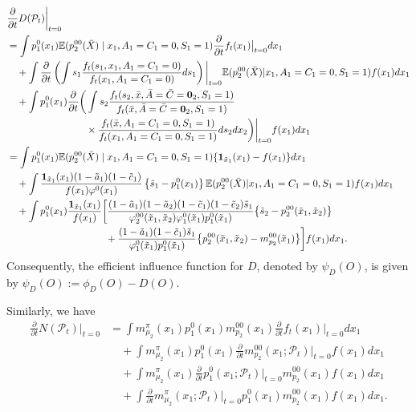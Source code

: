 \documentclass{article}
\newcommand{\pk}{{\varphi}}
\begin{document}
\begin{align}
	&\frac{\partial}{\partial t}D(\mathcal P_t) \bigg\vert_{t=0} \\
	&= \int p_1^0(x_1) \mathbb E(p_2^{00}(\bar X) \mid x_1, A_1=C_1=0, S_1=1) \frac{\partial}{\partial t} f_t(x_1) \big\vert_{t=0} dx_1 \\
	  &\quad+ \int \frac{\partial}{\partial t} \left( \int s_1 \frac{f_t(s_1, x_1, A_1=C_1=0)}{f_t(x_1, A_1=C_1=0)} ds_1 \right)\biggl\vert_{t=0} \mathbb E(p_2^{00}(\bar X) | x_1, A_1=C_1=0, S_1=1) f(x_1)dx_1 \\
	  &\quad+ \int p_1^0(x_1) \frac{\partial}{\partial t} \bigg( \int s_2 \frac{f_t(s_2, \bar x, \bar A=\bar C={\bf 0}_2, S_1=1)}{f_t(\bar x,\bar A=\bar C={\bf 0}_2,S_1=1)} \\
	   &\qquad\qquad\qquad\qquad\times\frac{f_t(\bar x,A_1=C_1=0,S_1=1)}{f_t(x_1,A_1=C_1=0,S_1=1)} ds_2dx_2 \bigg)  \bigg\vert_{t=0} f(x_1)dx_1 \\
	&= \int p_1^0(x_1) \mathbb E(p_2^{00}(\bar X) \mid x_1, A_1=C_1=0, S_1=1) \{ \mathbf1_{\tilde x_1}(x_1) - f(x_1) \} dx_1 \\
	  &\quad+ \int \frac{\mathbf1_{\tilde x_1}(x_1) (1-\tilde a_1)(1-\tilde c_1)}{f(x_1) \pk^0(x_1)} \left\{ \tilde s_1 - p_1^0(x_1) \right\} \mathbb E(p_2^{00}(\bar X) | x_1, A_1=C_1=0, S_1=1) f(x_1)dx_1 \\
	  &\quad+ \int p_1^0(x_1) 
	  \frac{\mathbf1_{\tilde x_1}(x_1)}{f(x_1)} \bigg[
	    \frac{(1-\tilde a_1)(1-\tilde a_2)(1-\tilde c_1)(1-\tilde c_2)\tilde s_1}{\pk_2^{00}(\tilde x_1, \tilde x_2)\pk_1^0(\tilde x_1)p_1^0(\tilde x_1)} \big\{ \tilde s_2 - p_2^{00}(\tilde x_1, \tilde x_2) \big\} \\
	    &\qquad\qquad\qquad\qquad\qquad+
	     \frac{(1-\tilde a_1)(1-\tilde c_1)\tilde s_1}{\pk_1^0(\tilde x_1)p_1^0(\tilde x_1)} \big\{ p_2^{00}(\tilde x_1, \tilde x_2) - m_{p_2}^{00}(\tilde x_1) \big\}
	  \bigg] f(x_1)dx_1.
\end{align}
Consequently, the efficient influence function for $D$, denoted by $\psi_D(O)$, is given by
$
\psi_D(O) := \phi_D(O) - D(O).
$

Similarly, we have
\begin{align}
	\frac{\partial}{\partial t} N(\mathcal P_t) \bigg\vert_{t=0}
	&= \int m_{\mu_2}^\pi(x_1) p_1^0(x_1) m_{p_2}^{00}(x_1) \frac{\partial}{\partial t} f_t(x_1) \big\vert_{t=0} dx_1  \label{eq:N1} \\
	  &\quad+ \int m_{\mu_2}^\pi(x_1) p_1^0(x_1) \frac{\partial}{\partial t} m_{p_2}^{00}(x_1;\mathcal P_t) \bigg\vert_{t=0} f(x_1) dx_1   \label{eq:N2} \\
	  &\quad+ \int m_{\mu_2}^\pi(x_1) \frac{\partial}{\partial t} p_1^0(x_1;\mathcal P_t) \bigg\vert_{t=0} m_{p_2}^{00}(x_1) f(x_1) dx_1  \label{eq:N3} \\
	  &\quad+ \int \frac{\partial}{\partial t} m_{\mu_2}^\pi(x_1;\mathcal P_t) \bigg\vert_{t=0} p_1^0(x_1) m_{p_2}^{00}(x_1) f(x_1) dx_1.  \label{eq:N4}
\end{align}
\end{document}
